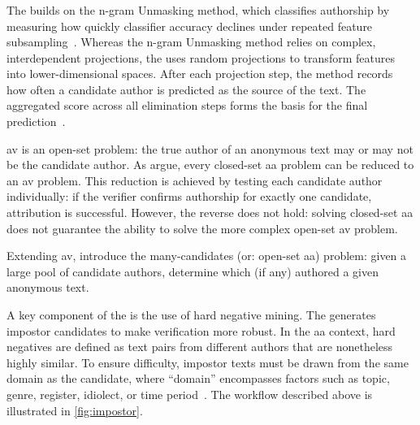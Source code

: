 
%     


\subsubsection{\impAppr{}}
\label{sec:impostor_method_theory}

The \impAppr{} builds on the n-gram Unmasking method, which classifies authorship by measuring how quickly classifier accuracy declines under repeated feature subsampling~\citep{koppel_authorship_2004}. 
Whereas the n-gram Unmasking method relies on complex, interdependent projections, the \impAppr{} uses random projections to transform features into lower-dimensional spaces.
After each projection step, the method records how often a candidate author is predicted as the source of the text. 
The aggregated score across all elimination steps forms the basis for the final prediction~\citep{tyo_state_2022}.

\ac{av} is an open-set problem: the true author of an anonymous text may or may not be the candidate author. 
As \citet{koppel_determining_2014} argue, every closed-set \ac{aa} problem can be reduced to an \ac{av} problem. 
This reduction is achieved by testing each candidate author individually: if the verifier confirms authorship for exactly one candidate, attribution is successful. 
However, the reverse does not hold: solving closed-set \ac{aa} does not guarantee the ability to solve the more complex open-set \ac{av} problem.

Extending \ac{av}, \citet{koppel_determining_2014} introduce the many-candidates (or: open-set \ac{aa}) problem: given a large pool of candidate authors, determine which (if any) authored a given anonymous text. 

A key component of the \impAppr{} is the use of hard negative mining. 
The \impAppr{} generates impostor candidates to make verification more robust. 
In the \ac{aa} context, hard negatives are defined as text pairs from different authors that are nonetheless highly similar. 
To ensure difficulty, impostor texts must be drawn from the same domain as the candidate, where “domain” encompasses factors such as topic, genre, register, idiolect, or time period~\citep{bischoff_importance_2020}. 
The workflow described above is illustrated in \autoref{fig:impostor}.

